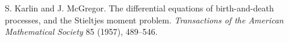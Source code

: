 S. Karlin and J. McGregor. The differential equations of birth-and-death processes, and the Stieltjes moment problem. \emph{Transactions of the American Mathematical Society} 85 (1957), 489--546.
